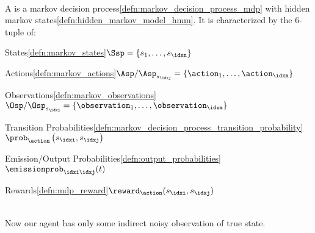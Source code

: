 \begin{defnbox}\nospacing
  \begin{defn}\label{defn:partially_observable_markov_decision_process_mdp}\leavevmode\\
    A  is a markov decision process\cref{defn:markov_decision_process_mdp} with hidden markov states\cref{defn:hidden_markov_model_hmm}.
    It is characterized by the 6-tuple of:
    \begin{circlelistnosep}
        \item States\cref{defn:markov_states}\hfill$\Ssp=\left\{s_{1},\ldots,s_{\idxn}\right\}$
        \item Actions\cref{defn:markov_actions}\hfill$\Asp/\Asp_{s_{\idxj}}=\left\{\action_{1},\ldots,\action_{\idxm}\right\}$
        \item Observations\cref{defn:markov_observations}\hfill$\Osp/\Osp_{s_{\idxj}}=\left\{\observation_{1},\ldots,\observation_{\idxm}\right\}$
        \item Transition Probabilities\cref{defn:markov_decision_process_transition_probability}\hfill$\prob_{\action}\left(s_{\idxi},s_{\idxj}\right)$
        \item Emission/Output Probabilities\cref{defn:output_probabilities}\hfill$\emissionprob_{\idxi\idxj}(t)$
        \item Rewards\cref{defn:mdp_reward}\hfill$\reward_{\action}(s_{\idxi},s_{\idxj})$
    \end{circlelistnosep}
        \centering{
            \resizebox{\linewidth}{!}{}
        }
  \end{defn}
\end{defnbox}
\begin{explanationbox}
  \begin{explanation}\leavevmode\\
    Now our agent has only some indirect noisy observation of true state.
  \end{explanation}
\end{explanationbox}
